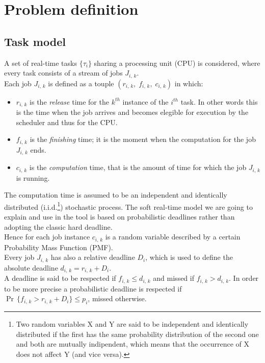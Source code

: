 \chapter{Problem definition}\label{chp:model}


\section{Task model}
A set of real-time tasks \( \{\tau_{i}\} \) sharing a processing unit (CPU) is considered, where every task consists of a stream of jobs \( J_{i,\,k} \).\\
Each job \( J_{i,\,k} \) is defined as a touple \( \left(r_{i,\,k}, \;f_{i,\,k}, \;c_{i,\,k}\right) \) in which:
\begin{itemize}
  \item \( r_{i,\,k} \) is the \emph{release} time for the \( k^{th} \) instance of the \( i^{th} \) task. In other words this is the time when the job arrives and becomes elegible for execution by the scheduler and thus for the CPU.
  \item \( f_{i,\,k} \) is the \emph{finishing} time; it is the moment when the computation for the job \( J_{i,\,k} \) ends.
  \item \( c_{i,\,k} \) is the \emph{computation} time, that is the amount of time for which the job \( J_{i,\,k} \) is running.
\end{itemize} 

The computation time is assumed to be an independent and identically distributed (i.i.d.\footnote{Two random variables X and Y are said to be independent and identically distributed if the first has the same probability distribution of the second one and both are mutually indipendent, which means that the occurrence of X does not affect Y (and vice versa).}) stochastic process. The soft real-time model we are going to explain and use in the tool is based on probabilistic deadlines rather than adopting the classic hard deadline.\\
Hence for each job instance \( c_{i,\,k} \) is a random variable described by a certain Probability Mass Function (PMF).\\
Every job \( J_{i,\,k} \) has also a relative deadline \( D_{i} \), which is used to define the absolute deadline \( d_{i,\,k} = r_{i,\,k} + D_{i} \). \\
A deadline is said to be respected if \( f_{i,\,k} \leq d_{i,\,k} \) and missed if \( f_{i,\,k} > d_{i,\,k} \). In order to be more precise a probabilistic deadline is respected if \( \Pr\,\{f_{i,\,k} > r_{i,\,k} + D_{i} \} \leq p_{i} \), missed otherwise.

